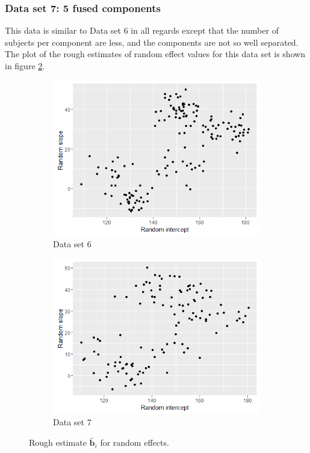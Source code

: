 \subsubsection{Data set 7: 5 fused components}
\label{subsubsec : ds_5fused}
This data is similar to Data set 6 in all regards except that the number of subjects per component are less, and the components are not so well separated. The plot of the rough estimates of random effect values for this data set is shown in figure \ref{fig : ds_5fused_randplot}.

\begin{figure}[!htb]
\centering
\captionsetup{justification=centering}
\begin{subfigure}[b]{0.4\textwidth}
		\includegraphics[width=\textwidth]{mainmatter/chapter_5_simulation_study/ds_5wellsep_randplot.png}
        \caption{\label{fig : ds_5wellsep_randplot}Data set 6}
	\end{subfigure}
	\begin{subfigure}[b]{0.4\textwidth}
		\includegraphics[width=\textwidth]{mainmatter/chapter_5_simulation_study/ds_5fused_randplot.png}
        \caption{\label{fig : ds_5fused_randplot}Data set 7}
	\end{subfigure}
	\caption{Rough estimate $\tilde{\boldsymbol{b}_i}$ for random effects.}
	\label{fig : ds_5wellsep_5fused}    
\end{figure}


